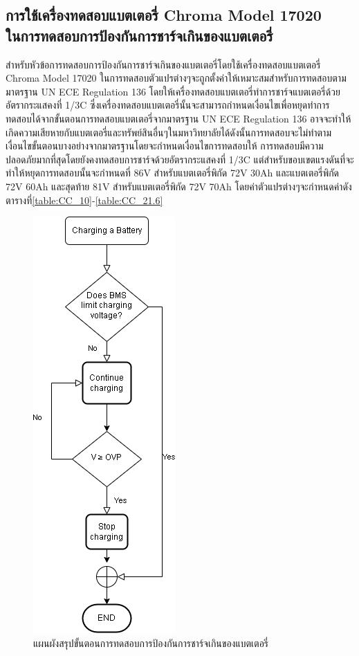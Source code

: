 \subsection{การใช้เครื่องทดสอบแบตเตอรี่ Chroma Model 17020 \\ ในการทดสอบการป้องกันการชาร์จเกินของแบตเตอรี่}
สำหรับหัวข้อการทดสอบการป้องกันการชาร์จเกินของแบตเตอรี่โดยใช้เครื่องทดสอบแบตเตอรี่ Chroma Model 17020 ในการทดสอบตัวแปรต่างๆจะถูกตั้งค่าให้เหมาะสมสำหรับการทดสอบตามมาตรฐาน UN ECE Regulation 136 โดยให้เครื่องทดสอบแบตเตอรี่ทำการชาร์จแบตเตอรี่ด้วยอัตรากระแสคงที่ 1/3C ซึ่งเครื่องทดสอบแบตเตอรี่นั้นจะสามารถกำหนดเงื่อนไขเพื่อหยุดทำการทดสอบได้จากขั้นตอนการทดสอบแบตเตอรี่จากมาตรฐาน 
UN ECE Regulation 136 อาจจะทำให้เกิดความเสียหายกับแบตเตอรี่และทรัพย์สินอื่นๆในมหาวิทยาลัยได้ดังนั้นการทดสอบจะไม่ทำตามเงื่อนไขขั้นตอนบางอย่างจากมาตรฐานโดยจะกำหนดเงื่อนไขการทดสอบให้
การทดสอบมีความปลอดภัยมากที่สุดโดยยังคงทดสอบการชาร์จด้วยอัตรากระแสคงที่ 1/3C แต่สำหรับขอบเขตแรงดันที่จะทำให้หยุดการทดสอบนั้นจะกำหนดที่ 86V สำหรับแบตเตอรี่พิกัด 72V 30Ah และแบตเตอรี่พิกัด 72V 60Ah และสุดท้าย 81V สำหรับแบตเตอรี่พิกัด 72V 70Ah โดยค่าตัวแปรต่างๆจะกำหนดค่าดังตารางที่\ref{table:CC_10}-\ref{table:CC_21.6}
\begin{center}
	\begin{figure}[H]
		\includegraphics[width=0.25\linewidth]{Chapters/img/R136_DEMO/Charging_flow_chart.png}
		\centering
		\captionsetup{justification=centering,margin=2cm}
		\caption{แผนผังสรุปขั้นตอนการทดสอบการป้องกันการชาร์จเกินของแบตเตอรี่}
	\end{figure}
\end{center}
